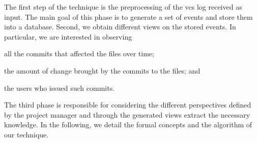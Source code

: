 The first step of the technique is the preprocessing of the \gls{vcs} log received as input. The main goal of this phase is to generate a set of events and store them into a database. Second, we obtain different views on the stored events. In particular, we are interested in observing
\begin{inparaenum}[\itshape i)]
	\item all the commits that affected the files over time;
	\item the amount of change brought by the commits to the files; and
	\item the users who issued such commits.
\end{inparaenum}
The third phase is responsible for considering the different perspectives defined by the project manager and through the generated views extract the necessary knowledge. In the following, we detail the formal concepts and the algorithm of our technique.



%





%


%

%

